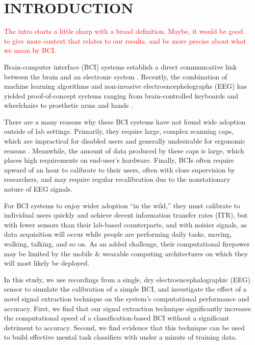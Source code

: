 \section{\uppercase{Introduction}}
\label{sec:introduction}

\textcolor{red}{The intro starts a little sharp with a broad definition. Maybe, it would be good to give more context that relates to our results, and be more precise about what we mean by BCI.}

\noindent Brain-computer interface (BCI) systems establish a direct communcative link between the brain and an electronic system \cite{dornhege_toward_2007,mcfarland_brain-computer_2011}.  Recently, the combination of machine learning algorithms and non-invasive electroencephelographs (EEG) has yielded proof-of-concept systems ranging from brain-controlled keyboards and wheelchairs to prosthetic arms and hands \cite{blankertz_note_2007,millan_combining_2010,d._mattia_brain_2011,hill_practical_2014,campbell_neurophone:_2010}. 

There are a many reasons why these BCI systems have not found wide adoption outside of lab settings. Primarily, they require large, complex scanning caps, which are impractical for disabled users and generally undesirable for ergonomic reasons \cite{ekandem_evaluating_2012,leeb_transferring_2013}. Meanwhile, the amount of data produced by these caps is large, which places high requirements on end-user's hardware. Finally, BCIs often require upward of an hour to calibrate to their users, often with close supervision by researchers, and may require regular recalibration due to the nonstationary nature of EEG signals. \cite{vidaurre_fully_2006,vidaurre_co-adaptive_2011,blankertz_non-invasive_2007} 

For BCI systems to enjoy wider adoption ``in the wild,'' they must calibrate to individual users quickly and achieve decent information transfer rates (ITR), but with fewer sensors than their lab-based counterparts, and with noisier signals, as data acquisition will occur while people are performing daily tasks, moving, walking, talking, and so on. As an added challenge, their computational firepower may be limited by the mobile \& wearable computing architectures on which they will most likely be deployed. 

In this study, we use recordings from a single, dry electroencephalographic (EEG) sensor to simulate the calibration of a simple BCI, and investigate the effect of a novel signal extraction technique on the system’s computational performance and accuracy. First, we find that our signal extraction technique significantly increases the computational speed of a classification-based BCI without a significant detriment to accuracy. Second, we find evidence that this technique can be used to build effective mental task classifiers with under a minute of training data.